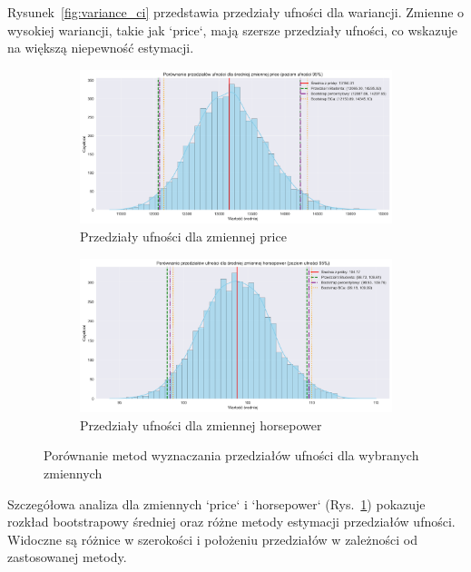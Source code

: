 \documentclass[12pt,a4paper]{article}
\begin{document}
Rysunek~\ref{fig:variance_ci} przedstawia przedziały ufności dla wariancji. Zmienne o wysokiej wariancji, takie jak `price`, mają szersze przedziały ufności, co wskazuje na większą niepewność estymacji.

\begin{figure}[H]
    \centering
    \begin{subfigure}[b]{0.48\textwidth}
        \includegraphics[width=\textwidth]{figures/ci_comparison_price.png}
        \caption{Przedziały ufności dla zmiennej price}
    \end{subfigure}
    \hfill
    \begin{subfigure}[b]{0.48\textwidth}
        \includegraphics[width=\textwidth]{figures/ci_comparison_horsepower.png}
        \caption{Przedziały ufności dla zmiennej horsepower}
    \end{subfigure}
    \caption{Porównanie metod wyznaczania przedziałów ufności dla wybranych zmiennych}
    \label{fig:ci_comparison_selected}
\end{figure}

Szczegółowa analiza dla zmiennych `price` i `horsepower` (Rys.~\ref{fig:ci_comparison_selected}) pokazuje rozkład bootstrapowy średniej oraz różne metody estymacji przedziałów ufności. Widoczne są różnice w szerokości i położeniu przedziałów w zależności od zastosowanej metody.
\end{document}
